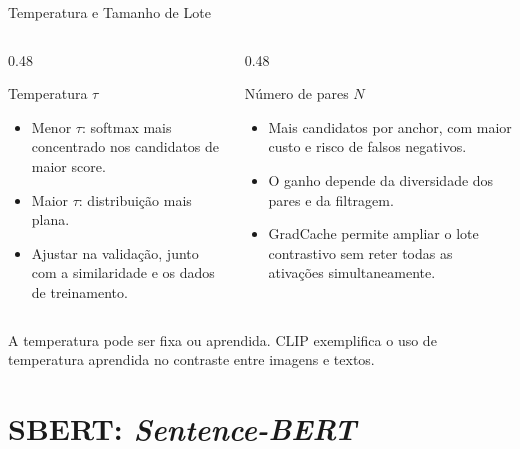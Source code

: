 \documentclass[aspectratio=169, xcolor=dvipsnames]{beamer}
\begin{document}
  \begin{frame}{Temperatura e Tamanho de Lote}
    \begin{columns}[T]
      \begin{column}{0.48\textwidth}
        \begin{block}{Temperatura $\tau$}
          \begin{itemize}\small
            \item Menor $\tau$: softmax mais concentrado nos candidatos de maior score.
            \item Maior $\tau$: distribuição mais plana.
            \item Ajustar na validação, junto com a similaridade e os dados de treinamento.
          \end{itemize}
        \end{block}
      \end{column}
      \begin{column}{0.48\textwidth}
        \begin{block}{Número de pares $N$}
          \begin{itemize}\small
            \item Mais candidatos por anchor, com maior custo e risco de falsos negativos.
            \item O ganho depende da diversidade dos pares e da filtragem.
            \item GradCache permite ampliar o lote contrastivo sem reter todas as ativações simultaneamente.
          \end{itemize}
        \end{block}
      \end{column}
    \end{columns}
    \medskip
    A temperatura pode ser fixa ou aprendida. CLIP exemplifica o uso de
    temperatura aprendida no contraste entre imagens e textos.
  \end{frame}

  \section{SBERT: \textit{Sentence-BERT}}
\end{document}
